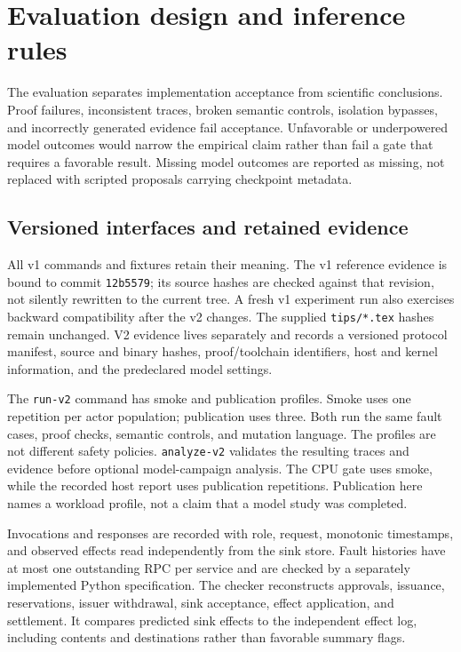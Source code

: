 \section{Evaluation design and inference rules}
\label{sec:v2evaluation}
The evaluation separates implementation acceptance from scientific conclusions.
Proof failures, inconsistent traces, broken semantic controls, isolation bypasses,
and incorrectly generated evidence fail acceptance. Unfavorable or underpowered
model outcomes would narrow the empirical claim rather than fail a gate that
requires a favorable result. Missing model outcomes are reported as missing,
not replaced with scripted proposals carrying checkpoint metadata.

\subsection{Versioned interfaces and retained evidence}
All v1 commands and fixtures retain their meaning. The v1 reference evidence is
bound to commit \texttt{12b5579}; its source hashes are checked against that
revision, not silently rewritten to the current tree. A fresh v1 experiment run
also exercises backward compatibility after the v2 changes. The supplied
\texttt{tips/*.tex} hashes remain unchanged. V2 evidence lives separately and
records a versioned protocol manifest, source and binary hashes, proof/toolchain
identifiers, host and kernel information, and the predeclared model settings.

The \texttt{run-v2} command has smoke and publication profiles. Smoke uses one
repetition per actor population; publication uses three. Both run the same fault
cases, proof checks, semantic controls, and mutation language. The profiles are
not different safety policies. \texttt{analyze-v2} validates the resulting traces
and evidence before optional model-campaign analysis. The CPU gate uses smoke,
while the recorded host report uses publication repetitions. Publication here
names a workload profile, not a claim that a model study was completed.

Invocations and responses are recorded with role, request, monotonic timestamps,
and observed effects read independently from the sink store. Fault histories
have at most one outstanding RPC per service and are checked by a separately
implemented Python specification. The checker reconstructs approvals, issuance,
reservations, issuer withdrawal, sink acceptance, effect application, and
settlement. It compares predicted sink effects to the independent effect log,
including contents and destinations rather than favorable summary flags.

